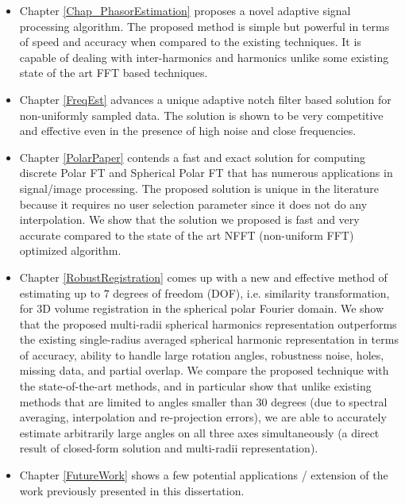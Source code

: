 \documentclass{UCF_ETD}
\begin{document}
\begin{itemize}
\item
Chapter \ref{Chap_PhasorEstimation} proposes a novel adaptive signal processing algorithm. The proposed method is simple but powerful in terms of speed and accuracy when compared to the existing techniques. It is capable of dealing with inter-harmonics and harmonics unlike some existing state of the art FFT based techniques. 

\item
Chapter \ref{FreqEst} advances a unique adaptive notch filter based solution for non-uniformly sampled data. The solution is shown to be very competitive and effective even in the presence of high noise and close frequencies. 

\item Chapter \ref{PolarPaper} contends a fast and exact solution for computing discrete Polar FT and Spherical Polar FT that has numerous applications in signal/image processing. The proposed solution is unique in the literature because it requires no user selection parameter since it does not do any interpolation. We show that the solution we proposed is fast and very accurate compared to the state of the art NFFT (non-uniform FFT) optimized algorithm. 

\item Chapter \ref{RobustRegistration} comes up with a new and effective method of estimating up to $7$ degrees of freedom (DOF), i.e. similarity transformation, for 3D volume registration in the spherical polar Fourier domain. We show that the proposed multi-radii spherical harmonics representation outperforms the existing single-radius averaged spherical harmonic representation in terms of accuracy, ability to handle large rotation angles, robustness noise, holes, missing data, and partial overlap. We compare the proposed technique with the state-of-the-art methods, and in particular show that unlike existing methods that are limited to angles smaller than $30$ degrees (due to spectral averaging, interpolation and re-projection errors), we are able to accurately estimate arbitrarily large angles on all three axes simultaneously (a direct result of closed-form solution and multi-radii representation). 
  
 \item Chapter \ref{FutureWork} shows a few potential applications / extension of the work previously presented in this dissertation. 
  
\end{itemize}
\end{document}
